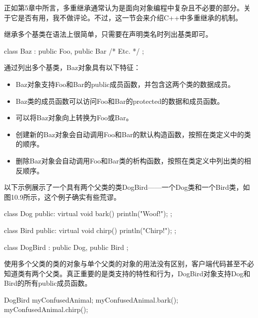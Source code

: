 
正如第5章中所言，多重继承通常认为是面向对象编程中复杂且不必要的部分。关于它是否有用，我不做评论。不过，这一节会来介绍C++中多重继承的机制。


继承多个基类在语法上很简单，只需要在声明类名时列出基类即可。

\begin{cpp}
class Baz : public Foo, public Bar { /* Etc. */ };
\end{cpp}

通过列出多个基类，Baz对象具有以下特征：

\begin{itemize}
\item
Baz对象支持Foo和Bar的public成员函数，并包含这两个类的数据成员。

\item
Baz类的成员函数可以访问Foo和Bar的protected的数据和成员函数。

\item
可以将Baz对象向上转换为Foo或Bar。

\item
创建新的Baz对象会自动调用Foo和Bar的默认构造函数，按照在类定义中的类的顺序。

\item
删除Baz对象会自动调用Foo和Bar类的析构函数，按照在类定义中列出类的相反顺序。
\end{itemize}

以下示例展示了一个具有两个父类的类DogBird——一个Dog类和一个Bird类，如图10.9所示，这个例子确实有些荒谬。


\begin{cpp}
class Dog
{
    public:
        virtual void bark() { println("Woof!"); }
};

class Bird
{
    public:
        virtual void chirp() { println("Chirp!"); }
};

class DogBird : public Dog, public Bird
{
};
\end{cpp}

使用多个父类的类的对象与单个父类的对象的用法没有区别，客户端代码甚至不必知道类有两个父类。真正重要的是类支持的特性和行为，DogBird对象支持Dog和Bird的所有public成员函数。

\begin{cpp}
DogBird myConfusedAnimal;
myConfusedAnimal.bark();
myConfusedAnimal.chirp();
\end{cpp}

